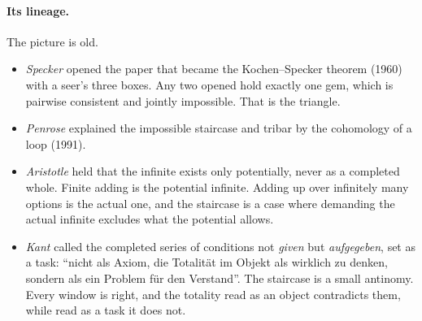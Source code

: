 \documentclass[11pt]{article}
\theoremstyle{plain}
\theoremstyle{definition}
\begin{document}
\paragraph{Its lineage.} The picture is old.
\begin{itemize}[nosep]
  \item \emph{Specker} opened the paper that became the Kochen--Specker theorem
    (1960) with a seer's three boxes. Any two opened hold exactly one gem, which
    is pairwise consistent and jointly impossible. That is the triangle.
  \item \emph{Penrose} explained the impossible staircase and tribar by the
    cohomology of a loop (1991).
  \item \emph{Aristotle} held that the infinite exists only potentially, never
    as a completed whole. Finite adding is the potential infinite. Adding up
    over infinitely many options is the actual one, and the staircase is a case
    where demanding the actual infinite excludes what the potential allows.
  \item \emph{Kant} called the completed series of conditions not \emph{given}
    but \emph{aufgegeben}, set as a task: ``nicht als Axiom, die Totalit\"at im
    Objekt als wirklich zu denken, sondern als ein Problem f\"ur den Verstand''.
    The staircase is a small antinomy. Every window is right, and the totality
    read as an object contradicts them, while read as a task it does not.
\end{itemize}
\end{document}
